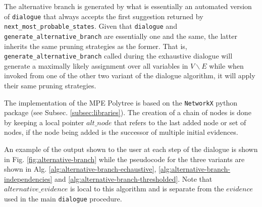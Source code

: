 The alternative branch is generated by what is essentially an automated version of \texttt{dialogue} that always accepts the first suggestion returned by \texttt{next\_most\_probable\_states}.
Given that \texttt{dialogue} and \texttt{generate\_alternative\_branch} are essentially one and the same, the latter inherits the same pruning strategies as the former.
That is, \texttt{generate\_alternative\_branch} called during the exhaustive dialogue will generate a maximally likely assignment over all variables in $V \smallsetminus E$ while when invoked from one of the other two variant of the dialogue algorithm, it will apply their same pruning strategies.

The implementation of the MPE Polytree is based on the \texttt{NetworkX} python package (see Subsec. \ref{subsec:libraries}).
The creation of a chain of nodes is done by keeping a local pointer $alt\_node$ that refers to the last added node or set of nodes, if the node being added is the successor of multiple initial evidences. 

An example of the output shown to the user at each step of the dialogue is shown in Fig. \ref{fig:alternative-branch} while the pseudocode for the three variants are shown in Alg. \ref{alg:alternative-branch-echaustive}, \ref{alg:alternative-branch-independencies} and \ref{alg:alternative-branch-thresholded}.
Note that $alternative\_evidence$ is local to this algorithm and is separate from the $evidence$ used in the main \texttt{dialogue} procedure.


